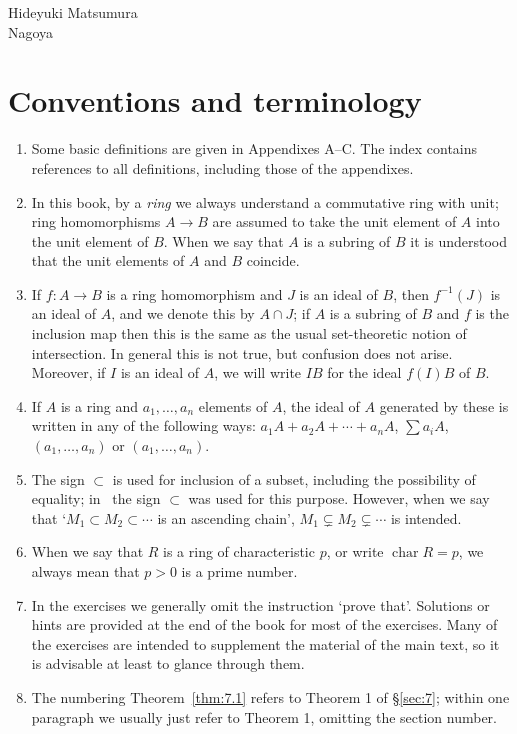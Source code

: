 \begin{flushright}
Hideyuki Matsumura\\
Nagoya
\end{flushright}

\chapter*{Conventions and terminology}

\begin{enumerate}
  \item[(1)] Some basic definitions are given in Appendixes A--C. The index contains
  references to all definitions, including those of the appendixes.
  \item[(2)] In this book, by a \emph{ring} we always understand a commutative ring with
  unit; ring homomorphisms $A \to B$ are assumed to take the unit element
  of $A$ into the unit element of $B$. When we say that $A$ is a subring of $B$
  it is understood that the unit elements of $A$ and $B$ coincide.
  \item[(3)] If $f\colon A \to B$ is a ring homomorphism and $J$ is an ideal of $B$, then
  $f^{-1}(J)$ is an ideal of $A$, and we denote this by $A \cap J$; if $A$ is a subring of
  $B$ and $f$ is the inclusion map then this is the same as the usual set-theoretic
  notion of intersection. In general this is not true, but confusion does not
  arise. Moreover, if $I$ is an ideal of $A$, we will write $IB$ for the ideal $f(I)B$ of $B$.
  \item[(4)] If $A$ is a ring and $a_1, \ldots, a_n$ elements of $A$, the ideal of $A$ generated by
  these is written in any of the following ways: $a_1A + a_2A + \cdots + a_nA$, $\sum a_iA$,
  $(a_1, \ldots, a_n)$ or $(a_1, \ldots, a_n)$.
  \item[(5)] The sign $\subset$ is used for inclusion of a subset, including the possibility of
  equality; in~\cite{M} the sign $\subset$ was used for this purpose. However, when we
  say that `$M_1 \subset M_2 \subset \cdots$ is an ascending chain', $M_1 \subsetneq M_2 \subsetneq \cdots$ is intended.
  \item[(6)] When we say that $R$ is a ring of characteristic $p$, or write $\operatorname{char} R = p$, we
  always mean that $p > 0$ is a prime number.
  \item[(7)] In the exercises we generally omit the instruction `prove that'. Solutions
  or hints are provided at the end of the book for most of the exercises. Many of
  the exercises are intended to supplement the material of the main text, so it
  is advisable at least to glance through them.
  \item[(8)] The numbering Theorem~\ref{thm:7.1} refers to Theorem 1 of \S\ref{sec:7}; within
  one paragraph we usually just refer to Theorem 1, omitting the section
  number.
\end{enumerate}
